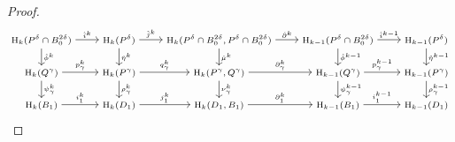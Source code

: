 \begin{proof}
\begin{equation}
\begin{scriptsize}
\begin{tikzcd}
    \hom_k(P^\delta\cap B_0^{2\delta})\arrow{r}{\hat{i}^k}\arrow{d}{\hat{\phi}^k} &
    \hom_k(P^\delta)\arrow{r}{\hat{j}^k}\arrow{d}{\hat{\eta}^k} &
    \hom_k(P^\delta\cap B_0^{2\delta}, P^\delta\cap B_0^{2\delta})\arrow{r}{\hat{\partial}^k}\arrow{d}{\hat{\mu}^k} &
    \hom_{k-1}(P^\delta\cap B_0^{2\delta})\arrow{r}{\hat{i}^{k-1}}\arrow{d}{\hat{\phi}^{k-1}} &
    \hom_{k-1}(P^\delta)\arrow{d}{\hat{\eta}^{k-1}}\\
    \hom_k(Q^\gamma)\arrow{r}{p^k_\gamma} \arrow{d}{\psi^k_\gamma} &
    \hom_k(P^\gamma)\arrow{r}{q^k_\gamma} \arrow{d}{\rho^k_\gamma} &
    \hom_k(P^\gamma, Q^\gamma)\arrow{r}{\partial^k_\gamma} \arrow{d}{\nu^k_\gamma} &
    \hom_{k-1}(Q^\gamma)\arrow{r}{p^{k-1}_\gamma} \arrow{d}{\psi^{k-1}_\gamma} &
    \hom_{k-1}(P^\gamma)\arrow{d}{\rho^{k-1}_\gamma}\\
    \hom_k(B_1)\arrow{r}{i^k_1} &
    \hom_k(D_1)\arrow{r}{j^k_1} &
    \hom_k(D_1, B_1)\arrow{r}{\partial^k_1} &
    \hom_{k-1}(B_1)\arrow{r}{i^{k-1}_1} &
    \hom_{k-1}(D_1)
\end{tikzcd}
\end{scriptsize}
\end{equation}

\end{proof}

